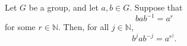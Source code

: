 Let \(G\) be a group, and let \(a, b \in G\). Suppose that 
\[
b a b^{-1} = a^r
\] 
for some $r \in \mathbb{N}$. Then, for all $j \in \mathbb{N}$, 
\[
b^j a b^{-j} = a^{r^j}.
\]
